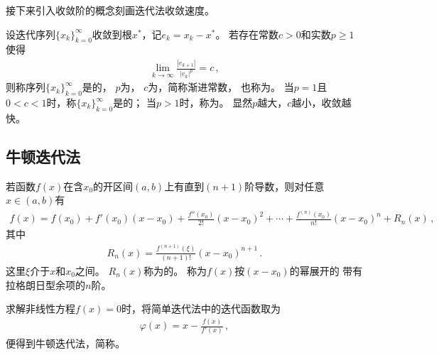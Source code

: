 接下来引入收敛阶的概念刻画迭代法收敛速度。
\begin{definition}
    设迭代序列$\{x_k\}_{k=0}^\infty$收敛到根$x^*$，记$e_k=x_k-x^*$。
    若存在常数$c>0$和实数$p\ge1$使得
    \begin{align}\label{eq:02ex0324}
        \lim\limits_{k\rightarrow\infty}{\frac{|e_{k+1}|}{|e_k|^p}}=c\, ,
    \end{align}
    则称序列$\{x_k\}_{k=0}^\infty$是的，
    $p$为，
    $c$为，简称渐进常数，
    也称为。
    当$p=1$且$0<c<1$时，称$\{x_k\}_{k=0}^\infty$是的；
    当$p>1$时，称为。
    显然$p$越大，$c$越小，收敛越快。
\end{definition}

\subsection{牛顿迭代法}\label{sub:牛顿迭代法}
\begin{theorem}
    若函数$f(x)$在含$x_0$的开区间$(a,b)$上有直到$(n+1)$阶导数，则对任意$x\in(a,b)$有
    \begin{align}\label{eq:02ex0325.1}
        f(x)=f(x_0)+f'(x_0)(x-x_0)+\frac{f''(x_0)}{2!}(x-x_0)^2+\cdots+\frac{f^{(n)}(x_0)}{n!}(x-x_0)^n+R_n(x)\, ,
    \end{align}
    其中
    \begin{align}\label{eq:02ex0325.2}
        R_n(x)=\frac{f^{(n+1)}(\xi)}{(n+1)!}(x-x_0)^{n+1}\, .
    \end{align}
    这里$\xi$介于$x$和$x_0$之间。
    $R_n(x)$称为的。
    称为$f(x)$按$(x-x_0)$的幂展开的
    带有拉格朗日型余项的$n$阶。
\end{theorem}

求解非线性方程$f(x)=0$时，将简单迭代法中的迭代函数取为
\begin{align}\label{eq:02ex0325}
    \varphi(x)=x-\frac{f(x)}{f'(x)}\, ,
\end{align}
便得到牛顿迭代法，简称。

